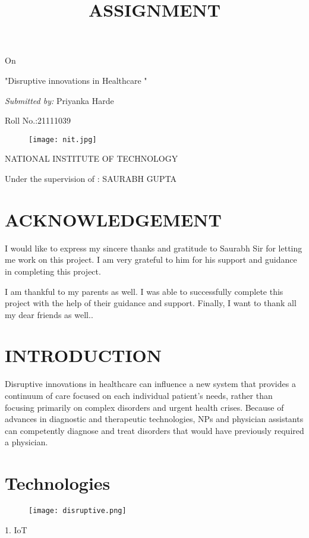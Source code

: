 \documentclass[11pt]{article}
\title{\Huge \textbf{ASSIGNMENT}}
\begin{document}
\maketitle
\centering On

\Huge "Disruptive innovations in Healthcare "
\setlength{\parskip}{0.5em}

\emph{\large Submitted by:}
\large Priyanka Harde

\large Roll No.:21111039
\begin{figure}[h]
\begin{center}
\texttt{[image: nit.jpg]}
\end{center}
\end{figure}

\textsc{\Large NATIONAL INSTITUTE OF TECHNOLOGY}

\large Under the supervision of : SAURABH GUPTA 
\clearpage 
\tableofcontents
\clearpage
\section{\huge  ACKNOWLEDGEMENT}
\Large \raggedright I would like to express my sincere thanks and gratitude to Saurabh Sir for letting me work on this project. I am very grateful to him for his support and guidance in completing this project.

I am thankful to my parents as well. I was able to successfully complete this project with the help of their guidance and support. Finally, I want to thank all my dear friends as well..





\section{\textbf{\huge INTRODUCTION}}
\raggedright Disruptive innovations in healthcare can influence a new system that provides a continuum of care focused on each individual patient's needs, rather than focusing primarily on complex disorders and urgent health crises. Because of advances in diagnostic and therapeutic technologies, NPs and physician assistants can competently diagnose and treat disorders that would have previously required a physician.

\section{\textbf{\huge Technologies}}
\begin{figure}
\centering \texttt{[image: disruptive.png]}
\end{figure}
\raggedright 1. IoT
\end{document}
